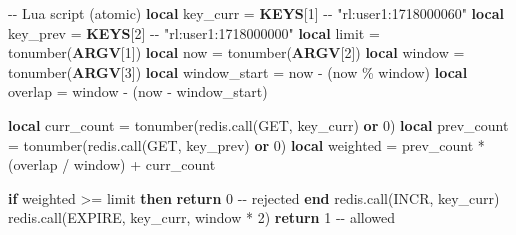 \documentclass[11pt]{article}
\newenvironment{Shaded}{\begin{snugshade}}{\end{snugshade}}
\newcommand{\CommentTok}[1]{\textcolor[rgb]{0.48,0.49,0.49}{#1}}
\newcommand{\ConstantTok}[1]{\textcolor[rgb]{0.15,0.68,0.68}{\textbf{#1}}}
\newcommand{\ControlFlowTok}[1]{\textcolor[rgb]{0.99,0.74,0.29}{\textbf{#1}}}
\newcommand{\DecValTok}[1]{\textcolor[rgb]{0.96,0.45,0.00}{#1}}
\newcommand{\FunctionTok}[1]{\textcolor[rgb]{0.56,0.27,0.68}{#1}}
\newcommand{\KeywordTok}[1]{\textcolor[rgb]{0.81,0.81,0.76}{\textbf{#1}}}
\newcommand{\NormalTok}[1]{\textcolor[rgb]{0.81,0.81,0.76}{#1}}
\newcommand{\OperatorTok}[1]{\textcolor[rgb]{0.81,0.81,0.76}{#1}}
\newcommand{\StringTok}[1]{\textcolor[rgb]{0.96,0.31,0.31}{#1}}
\newcommand{\VariableTok}[1]{\textcolor[rgb]{0.15,0.68,0.68}{#1}}
\begin{document}
\begin{Shaded}
\begin{Highlighting}[]
\CommentTok{{-}{-} Lua script (atomic)}
\KeywordTok{local} \VariableTok{key\_curr} \OperatorTok{=} \ConstantTok{KEYS}\OperatorTok{[}\DecValTok{1}\OperatorTok{]}  \CommentTok{{-}{-} "rl:user1:1718000060"}
\KeywordTok{local} \VariableTok{key\_prev} \OperatorTok{=} \ConstantTok{KEYS}\OperatorTok{[}\DecValTok{2}\OperatorTok{]}  \CommentTok{{-}{-} "rl:user1:1718000000"}
\KeywordTok{local} \VariableTok{limit}    \OperatorTok{=} \FunctionTok{tonumber}\OperatorTok{(}\ConstantTok{ARGV}\OperatorTok{[}\DecValTok{1}\OperatorTok{])}
\KeywordTok{local} \VariableTok{now}      \OperatorTok{=} \FunctionTok{tonumber}\OperatorTok{(}\ConstantTok{ARGV}\OperatorTok{[}\DecValTok{2}\OperatorTok{])}
\KeywordTok{local} \VariableTok{window}   \OperatorTok{=} \FunctionTok{tonumber}\OperatorTok{(}\ConstantTok{ARGV}\OperatorTok{[}\DecValTok{3}\OperatorTok{])}
\KeywordTok{local} \VariableTok{window\_start} \OperatorTok{=} \VariableTok{now} \OperatorTok{{-}} \OperatorTok{(}\VariableTok{now} \OperatorTok{\%} \VariableTok{window}\OperatorTok{)}
\KeywordTok{local} \VariableTok{overlap}  \OperatorTok{=} \VariableTok{window} \OperatorTok{{-}} \OperatorTok{(}\VariableTok{now} \OperatorTok{{-}} \VariableTok{window\_start}\OperatorTok{)}

\KeywordTok{local} \VariableTok{curr\_count} \OperatorTok{=} \FunctionTok{tonumber}\OperatorTok{(}\VariableTok{redis}\OperatorTok{.}\NormalTok{call}\OperatorTok{(}\StringTok{\textquotesingle{}GET\textquotesingle{}}\OperatorTok{,} \VariableTok{key\_curr}\OperatorTok{)} \KeywordTok{or} \DecValTok{0}\OperatorTok{)}
\KeywordTok{local} \VariableTok{prev\_count} \OperatorTok{=} \FunctionTok{tonumber}\OperatorTok{(}\VariableTok{redis}\OperatorTok{.}\NormalTok{call}\OperatorTok{(}\StringTok{\textquotesingle{}GET\textquotesingle{}}\OperatorTok{,} \VariableTok{key\_prev}\OperatorTok{)} \KeywordTok{or} \DecValTok{0}\OperatorTok{)}
\KeywordTok{local} \VariableTok{weighted}   \OperatorTok{=} \VariableTok{prev\_count} \OperatorTok{*} \OperatorTok{(}\VariableTok{overlap} \OperatorTok{/} \VariableTok{window}\OperatorTok{)} \OperatorTok{+} \VariableTok{curr\_count}

\ControlFlowTok{if} \VariableTok{weighted} \OperatorTok{\textgreater{}=} \VariableTok{limit} \ControlFlowTok{then}
  \ControlFlowTok{return} \DecValTok{0}  \CommentTok{{-}{-} rejected}
\ControlFlowTok{end}
\VariableTok{redis}\OperatorTok{.}\NormalTok{call}\OperatorTok{(}\StringTok{\textquotesingle{}INCR\textquotesingle{}}\OperatorTok{,} \VariableTok{key\_curr}\OperatorTok{)}
\VariableTok{redis}\OperatorTok{.}\NormalTok{call}\OperatorTok{(}\StringTok{\textquotesingle{}EXPIRE\textquotesingle{}}\OperatorTok{,} \VariableTok{key\_curr}\OperatorTok{,} \VariableTok{window} \OperatorTok{*} \DecValTok{2}\OperatorTok{)}
\ControlFlowTok{return} \DecValTok{1}  \CommentTok{{-}{-} allowed}
\end{Highlighting}
\end{Shaded}
\end{document}
